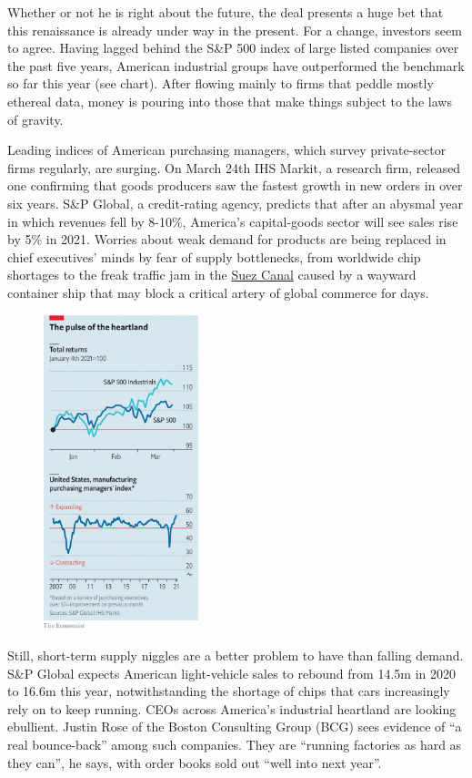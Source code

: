 \documentclass{article}
\begin{document}
Whether or not he is right about the future, the deal presents a huge bet that this renaissance is already under way in the present. For a change, investors seem to agree. Having lagged behind the S\&P 500 index of large listed companies over the past five years, American industrial groups have outperformed the benchmark so far this year (see chart). After flowing mainly to firms that peddle mostly ethereal data, money is pouring into those that make things subject to the laws of gravity. 

Leading indices of American purchasing managers, which survey private-sector firms regularly, are surging. On March 24th IHS Markit, a research firm, released one confirming that goods producers saw the fastest growth in new orders in over six years. S\&P Global, a credit-rating agency, predicts that after an abysmal year in which revenues fell by 8-10\%, America's capital-goods sector will see sales rise by 5\% in 2021. Worries about weak demand for products are being replaced in chief executives' minds by fear of supply bottlenecks, from worldwide chip shortages to the freak traffic jam in the \href{/node/21799686}{Suez Canal} caused by a wayward container ship that may block a critical artery of global commerce for days. 

\begin{figure}[h]
\centering
\includegraphics[width=0.4\textwidth]{images/20210327_wbc283.png}
\end{figure}


Still, short-term supply niggles are a better problem to have than falling demand. S\&P Global expects American light-vehicle sales to rebound from 14.5m in 2020 to 16.6m this year, notwithstanding the shortage of chips that cars increasingly rely on to keep running. CEOs across America's industrial heartland are looking ebullient. Justin Rose of the Boston Consulting Group (BCG) sees evidence of ``a real bounce-back'' among such companies. They are ``running factories as hard as they can'', he says, with order books sold out ``well into next year''. 
\end{document}
